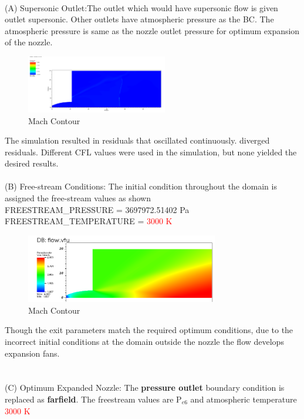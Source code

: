 \\
(A) Supersonic Outlet:The outlet which would have supersonic flow is given outlet supersonic. Other outlets have atmospheric pressure as the BC. The atmospheric pressure is same as the nozzle outlet pressure for optimum expansion of the nozzle. \\
\begin{figure}[H]
    \centering
    \includegraphics[width=0.55\textwidth]{text/F1.png}
    \caption[Mach Contour of Extended Mesh I]{Mach Contour}
    \label{fig:Mach Contour}
\end{figure}
The simulation resulted in residuals that oscillated continuously. diverged residuals. Different CFL values were used in the simulation, but none yielded the desired results.\\
\\
(B) Free-stream Conditions: The initial condition throughout the domain is assigned the free-stream values as shown\\
FREESTREAM\_PRESSURE = 3697972.51402 Pa\\
FREESTREAM\_TEMPERATURE = \textcolor{red}{3000 K} \\
\begin{figure}[H] 
    \centering
    \includegraphics[width=0.75\textwidth]{text/Mach contour 1.png}
    \caption[Mach Contour of Extended Mesh II]{Mach Contour}
    \label{fig:Mach Contour}
\end{figure}
Though the exit parameters match the required optimum conditions, due to the incorrect initial conditions at the domain outside the nozzle the flow develops expansion fans.\\
\\
\\
(C) Optimum Expanded Nozzle: The \textbf{pressure outlet} boundary condition is replaced as \textbf{farfield}. The freestream values are P$_{e6}$ and atmospheric temperature \textcolor{red}{3000 K}\\
